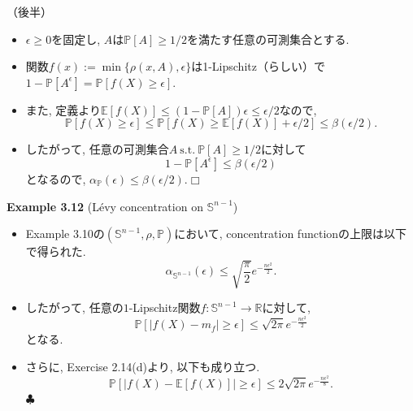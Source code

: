 \documentclass[aspectratio=169, dvipdfmx]{beamer}
\def\qed{\hfill $\Box$}
\def\endexample{\hfill $\clubsuit$}
\newcommand{\ex}{\mathbb{E}}
\begin{document}
\begin{frame}{}{}
{（後半）}
\begin{itemize}
    \item $\epsilon \ge 0$を固定し, $A$は$\mathbb{P}[A]\ge 1/2$を満たす任意の可測集合とする.
    \item 関数$f(x) := \min\{\rho(x, A), \epsilon\}$は1-Lipschitz（らしい）で$1-\mathbb{P}[A^\epsilon]=\mathbb{P}[f(X)\ge\epsilon]$.
    \item また, 定義より$\ex[f(X)] \le (1-\mathbb{P}[A])\epsilon \le \epsilon/2$なので, 
    \[ \mathbb{P}\left[f(X)\ge \epsilon\right] \le \mathbb{P}\left[f(X)\ge\ex[f(X)]+\epsilon/2\right] \le \beta(\epsilon/2). \]
    \item したがって, 任意の可測集合$A \mathrm{\ s.t.\ }\mathbb{P}[A]\ge 1/2$に対して
    \[ 1-\mathbb{P}[A^\epsilon] \le \beta(\epsilon/2) \]
    となるので, $\alpha_{\mathbb{P}}(\epsilon) \le \beta({\epsilon/2})$.\qed
\end{itemize}
\end{frame}

\begin{frame}{}{}
{\bf Example 3.12} (L\'evy concentration on $\mathbb{S}^{n-1}$)
\begin{itemize}
    \item Example 3.10の$(\mathbb{S}^{n-1}, \rho, \mathbb{P})$において, concentration functionの上限は以下で得られた.
    \[
        \alpha_{\mathbb{S}^{n-1}}(\epsilon) \le \sqrt{\frac{\pi}{2}}e^{-\frac{n\epsilon^2}{2}}.
    \]
    \item したがって, 任意の$1$-Lipschitz関数$f:\mathbb{S}^{n-1}\to\mathbb{R}$に対して,
    \[
        \mathbb{P}[|f(X)-m_f| \ge \epsilon] \le \sqrt{2\pi}e^{-\frac{n\epsilon^2}{2}}
    \tag{3.40}\label{3.40}
    \]
    となる.
    \item さらに, Exercise 2.14(d)より, 以下も成り立つ.
    \[
        \mathbb{P}[|f(X) - \ex[f(X)]| \ge \epsilon] \le 2\sqrt{2\pi}e^{-\frac{n\epsilon^2}{8}}.
        \tag{3.41}\label{3.41}
    \]
    \endexample
\end{itemize}
\end{frame}
\end{document}
